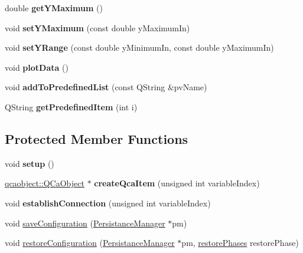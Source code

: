 \begin{DoxyCompactItemize}
\item 
\hypertarget{classQEStripChart_a1354bcbffa56b4c0c3691536f9a36911}{
double {\bfseries getYMaximum} ()}
\label{classQEStripChart_a1354bcbffa56b4c0c3691536f9a36911}

\item 
\hypertarget{classQEStripChart_a2a29999002274277a55a6e98daaa1ffa}{
void {\bfseries setYMaximum} (const double yMaximumIn)}
\label{classQEStripChart_a2a29999002274277a55a6e98daaa1ffa}

\item 
\hypertarget{classQEStripChart_a266a87d22bd013b219991117440538f0}{
void {\bfseries setYRange} (const double yMinimumIn, const double yMaximumIn)}
\label{classQEStripChart_a266a87d22bd013b219991117440538f0}

\item 
\hypertarget{classQEStripChart_aab6a8fde4f4797167c46a1a30ed1a352}{
void {\bfseries plotData} ()}
\label{classQEStripChart_aab6a8fde4f4797167c46a1a30ed1a352}

\item 
\hypertarget{classQEStripChart_ad8ec2c91a71563edd611be8f4cadb62e}{
void {\bfseries addToPredefinedList} (const QString \&pvName)}
\label{classQEStripChart_ad8ec2c91a71563edd611be8f4cadb62e}

\item 
\hypertarget{classQEStripChart_ade569a1445f704a0f809016dfb5b24f9}{
QString {\bfseries getPredefinedItem} (int i)}
\label{classQEStripChart_ade569a1445f704a0f809016dfb5b24f9}

\end{DoxyCompactItemize}
\subsection*{Protected Member Functions}
\begin{DoxyCompactItemize}
\item 
\hypertarget{classQEStripChart_adf7b76b1c510c9272bcf9dc56e0cb9bd}{
void {\bfseries setup} ()}
\label{classQEStripChart_adf7b76b1c510c9272bcf9dc56e0cb9bd}

\item 
\hypertarget{classQEStripChart_a6d845041e2311218e87c40a7390c0607}{
\hyperlink{classqcaobject_1_1QCaObject}{qcaobject::QCaObject} $\ast$ {\bfseries createQcaItem} (unsigned int variableIndex)}
\label{classQEStripChart_a6d845041e2311218e87c40a7390c0607}

\item 
\hypertarget{classQEStripChart_a0b4ba4e13940eab3360678545165ac34}{
void {\bfseries establishConnection} (unsigned int variableIndex)}
\label{classQEStripChart_a0b4ba4e13940eab3360678545165ac34}

\item 
void \hyperlink{classQEStripChart_a23260e4a79a63225c0a1622b62c82ca3}{saveConfiguration} (\hyperlink{classPersistanceManager}{PersistanceManager} $\ast$pm)
\item 
void \hyperlink{classQEStripChart_a25d6fea1c3e05fd58b55c60dcb1ef30b}{restoreConfiguration} (\hyperlink{classPersistanceManager}{PersistanceManager} $\ast$pm, \hyperlink{classQEWidget_acff38ca69eed5b30a9d5f9d055e7a0b1}{restorePhases} restorePhase)
\end{DoxyCompactItemize}

